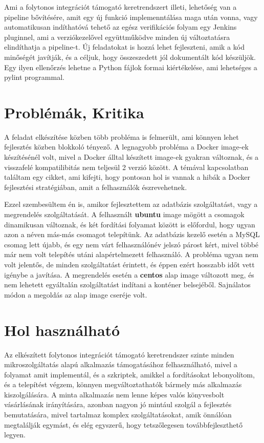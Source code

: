 \documentclass[11pt,magyar,a4paper,twoside,]{report}
\begin{document}
Ami a folytonos integrációt támogató keretrendszert illeti, lehetőség
van a pipeline bővítésére, amit egy új funkció implemenntálása maga után
vonna, vagy automatikusan indíthatóvá tehető az egész verifikációs
folyam egy Jenkins pluginnel, ami a verziókezelővel együttműködve minden
új változtatásra elindíthatja a pipeline-t. Új feladatokat is hozzá
lehet fejleszteni, amik a kód minőségét javítják, és a céljuk, hogy
összeszedett jól dokumentált kód készüljök. Egy ilyen ellenőrzés lehetne
a Python fájlok formai kiértékelése, ami lehetséges a pylint programmal.

\section{Problémák, Kritika}\label{probluxe9muxe1k-kritika}

A feladat elkészítése közben több probléma is felmerült, ami könnyen
lehet fejlesztés közben blokkoló tényező. A legnagyobb probléma a Docker
image-ek készítésénél volt, mivel a Docker álltal készített image-ek
gyakran változnak, és a visszafelé kompatilibitás nem teljesül 2 verzió
között. A témával kapcsolatban találtam egy cikket\citep{docker-is-bad},
ami kifejti, hogy pontosan hol is vannak a hibák a Docker fejlesztési
stratégiában, amit a felhasználók észrevehetnek.

Ezzel szembesültem én is, amikor fejlesztettem az adatbázis
szolgáltatást, vagy a megrendelés szolgáltatását. A felhasznált
\textbf{ubuntu} image mögött a csomagok dinamikusan változnak, és két
fordítási folyamat között is előfordul, hogy ugyan azon a néven más-más
csomagot telepítünk. Az adatbázis kezelő esetén a MySQL csomag lett
újabb, és egy nem várt felhasználónév jelszó párost kért, mivel többé
már nem volt telepítés utáni alapértelmezett felhasználó. A probléma
ugyan nem volt jelentős, de minden szolgáltatást érintett, és éppen
ezért hosszabb időt vett igénybe a javítása. A megrendelés esetén a
\textbf{centos} alap image változott meg, és nem lehetett egyáltalán
szolgáltatást indítani a konténer belsejéből. Sajnálatos módon a
megoldás az alap image cseréje volt.

\section{Hol használható}\label{hol-hasznuxe1lhatuxf3}

Az elkészített folytonos integrációt támogató keretrendszer szinte
minden mikroszolgáltatás alapú alkalmazás támogatásához felhasználható,
mivel a folyamat amit implementál, és a szkriptek, amikkel a
fordításokat lebonyolítom, és a telepítést végzem, könnyen
megváltoztathatók bármely más alkalmazás kiszolgálására. A minta
alkalmazás nem lenne képes valós könyvesbolt vásárlásának irányítására,
azonban nagyon jó mintául szolgál a fejlesztés bemutatására, mivel
tartalmaz komplex szolgáltatásokat, amik önnálóan megtalálják egymást,
és elég egyszerű, hogy tetszőlegesen továbbfejleszthető legyen.
\end{document}
